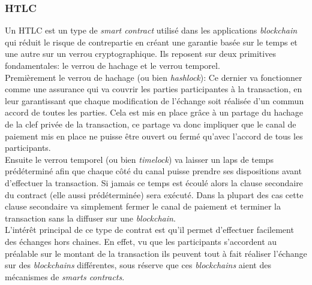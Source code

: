 \subsubsection{HTLC}

Un HTLC est un type de \textit{smart contract} utilisé dans les applications \textit{blockchain} qui réduit le risque de contrepartie en créant une garantie basée sur le temps et une autre sur un verrou cryptographique\cite{narayanam2022generalized}.
Ils reposent sur deux primitives fondamentales: le verrou de hachage et le verrou temporel.\\
Premièrement le verrou de hachage (ou bien \textit{hashlock}): Ce dernier va fonctionner comme une assurance qui va couvrir les parties participantes à la transaction, en leur garantissant que chaque modification de l'échange soit réalisée d'un commun accord de toutes les parties.
Cela est mis en place grâce à un partage du hachage de la clef privée de la transaction, ce partage va donc impliquer que le canal de paiement mis en place ne puisse être ouvert ou fermé qu'avec l'accord de tous les participants.\\
Ensuite le verrou temporel (ou bien \textit{timelock}) va laisser un laps de temps prédéterminé afin que chaque côté du canal puisse prendre ses dispositions avant d'effectuer la transaction. Si jamais ce temps est écoulé alors la clause secondaire du contract (elle aussi prédéterminée) sera exécuté. 
Dans la plupart des cas cette clause secondaire va simplement fermer le canal de paiement et terminer la transaction sans la diffuser sur une \textit{blockchain}.\\
L’intérêt principal de ce type de contrat est qu'il permet d'effectuer facilement des échanges hors chaines. En effet, vu que les participants s'accordent au préalable sur le montant de la transaction ils peuvent tout à fait réaliser l'échange sur des \textit{blockchains} différentes, sous réserve que ces \textit{blockchains} aient des mécanismes de \textit{smarts contracts}.

